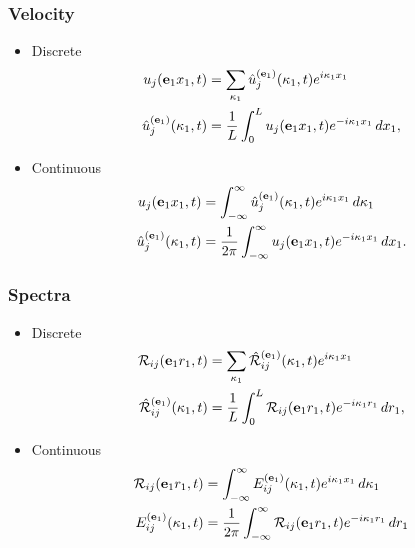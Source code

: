 \documentclass[oneside,a4paper,11pt]{report}
\begin{document}
\subsubsection{Velocity}
\begin{itemize}
\item Discrete
\begin{align}
u_j(\mathbf{e}_1 x_1,t) &= \sum_{\kappa_1} \hat{u}^{(\mathbf{e}_1)}_j(\kappa_1,t) e^{i \kappa_1 x_1}\\
\hat{u}^{(\mathbf{e}_1)}_j(\kappa_1,t) &= \frac{1}{L} \int_0^L u_j(\mathbf{e}_1 x_1,t) e^{-i \kappa_1 x_1} \, dx_1,
\end{align}
\item Continuous
\begin{align}
u_j(\mathbf{e}_1 x_1,t) &= \int_{-\infty}^{\infty} \hat{u}^{(\mathbf{e}_1)}_j(\kappa_1,t) e^{i \kappa_1 x_1} \, d\kappa_1 \\
\hat{u}^{(\mathbf{e}_1)}_j(\kappa_1,t) &= \frac{1}{2\pi} \int_{-\infty}^{\infty} u_j(\mathbf{e}_1 x_1,t) e^{-i \kappa_1 x_1} \, dx_1.
\end{align}
\end{itemize}

\subsubsection{Spectra}
\begin{itemize}
\item Discrete
\begin{align}
\mathcal{R}_{ij}(\mathbf{e}_1 r_1, t) &= \sum_{\kappa_1} \hat{\mathcal{R}}_{ij}^{(\mathbf{e}_1)}(\kappa_1,t) e^{i \kappa_1 x_1} \\
\hat{\mathcal{R}}_{ij}^{(\mathbf{e}_1)}(\kappa_1,t) &= \frac{1}{L} \int_0^L \mathcal{R}_{ij} (\mathbf{e}_1 r_1, t) e^{-i\kappa_1 r_1} \, dr_1,
\end{align}
\item Continuous
\begin{align}
\mathcal{R}_{ij}(\mathbf{e}_1 r_1, t) &= \int_{-\infty}^{\infty} E_{ij}^{(\mathbf{e}_1)}(\kappa_1,t) e^{i \kappa_1 x_1} \, d\kappa_1 \\
E_{ij}^{(\mathbf{e}_1)}(\kappa_1,t) &=  \frac{1}{2 \pi} \int_{-\infty}^{\infty} \mathcal{R}_{ij}(\mathbf{e}_1 r_1,t) e^{-i \kappa_1 r_1} \, d r_1
\end{align}
\end{itemize}
\end{document}
